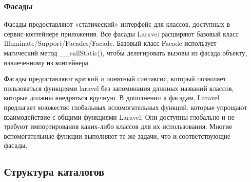 \subsubsection{Фасады}

Фасады предоставляют «статический» интерфейс для классов, доступных в сервис-контейнере приложения. Все фасады Laravel расширяют базовый класс Illuminate/Support/Facades/Facade. Базовый класс Facade использует магический метод \_\_callStatic(), чтобы делегировать вызовы из фасада объекту, извлеченному из контейнера.

Фасады предоставляют краткий и понятный синтаксис, который позволяет пользоваться функциями laravel без запоминания длинных названий классов, которые должны внедряться вручную. В дополнении к фасадам, Laravel предлагает множество глобальных вспомогательных функций, которые упрощают взаимодействие с общими функциями Laravel. Они доступны глобально и не требуют импортирования каких-либо классов для их использования. Многие вспомогательные функции выполняют те же задачи, что и соответствующие фасады.


\subsection{Структура каталогов}

